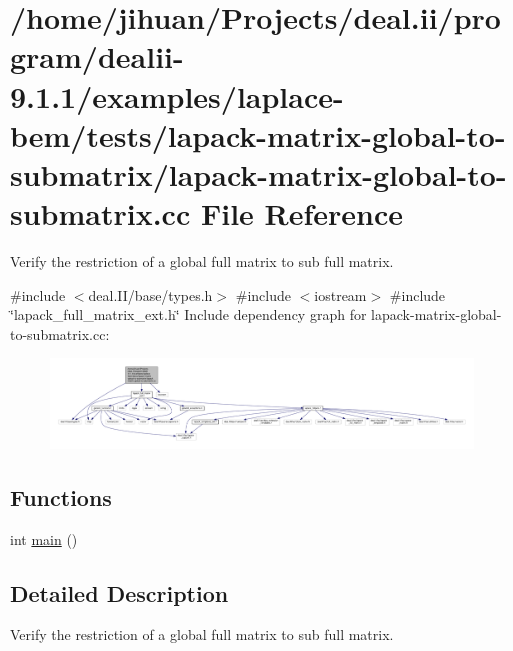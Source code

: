 \hypertarget{lapack-matrix-global-to-submatrix_8cc}{}\section{/home/jihuan/\+Projects/deal.ii/program/dealii-\/9.1.1/examples/laplace-\/bem/tests/lapack-\/matrix-\/global-\/to-\/submatrix/lapack-\/matrix-\/global-\/to-\/submatrix.cc File Reference}
\label{lapack-matrix-global-to-submatrix_8cc}


Verify the restriction of a global full matrix to sub full matrix.  


{\ttfamily \#include $<$deal.\+I\+I/base/types.\+h$>$}\newline
{\ttfamily \#include $<$iostream$>$}\newline
{\ttfamily \#include \char`\"{}lapack\+\_\+full\+\_\+matrix\+\_\+ext.\+h\char`\"{}}\newline
Include dependency graph for lapack-\/matrix-\/global-\/to-\/submatrix.cc\+:
\nopagebreak
\begin{figure}[H]
\begin{center}
\leavevmode
\includegraphics[width=350pt]{lapack-matrix-global-to-submatrix_8cc__incl}
\end{center}
\end{figure}
\subsection*{Functions}
\begin{DoxyCompactItemize}
\item 
int \hyperlink{lapack-matrix-global-to-submatrix_8cc_ae66f6b31b5ad750f1fe042a706a4e3d4}{main} ()
\end{DoxyCompactItemize}


\subsection{Detailed Description}
Verify the restriction of a global full matrix to sub full matrix. 

